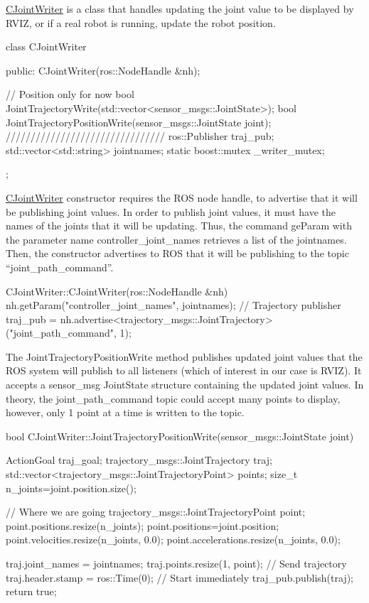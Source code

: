 \hyperlink{classCJointWriter}{C\-Joint\-Writer} is a class that handles updating the joint value to be displayed by R\-V\-I\-Z, or if a real robot is running, update the robot position. \begin{DoxyVerb}class CJointWriter {
public:
    CJointWriter(ros::NodeHandle &nh);

    // Position only for now
    bool JointTrajectoryWrite(std::vector<sensor_msgs::JointState>);
    bool JointTrajectoryPositionWrite(sensor_msgs::JointState joint);
    ////////////////////////////////
    ros::Publisher traj_pub;
    std::vector<std::string> jointnames;
    static boost::mutex _writer_mutex;
};  
\end{DoxyVerb}


\hyperlink{classCJointWriter}{C\-Joint\-Writer} constructor requires the R\-O\-S node handle, to advertise that it will be publishing joint values. In order to publish joint values, it must have the names of the joints that it will be updating. Thus, the command ge\-Param with the parameter name controller\-\_\-joint\-\_\-names retrieves a list of the jointnames. Then, the constructor advertises to R\-O\-S that it will be publishing to the topic “joint\-\_\-path\-\_\-command”. \begin{DoxyVerb}CJointWriter::CJointWriter(ros::NodeHandle &nh)
{
     nh.getParam("controller_joint_names", jointnames);
     // Trajectory publisher
    traj_pub = nh.advertise<trajectory_msgs::JointTrajectory>("joint_path_command", 1);
}
\end{DoxyVerb}


The Joint\-Trajectory\-Position\-Write method publishes updated joint values that the R\-O\-S system will publish to all listeners (which of interest in our case is R\-V\-I\-Z). It accepts a sensor\-\_\-msg Joint\-State structure containing the updated joint values. In theory, the joint\-\_\-path\-\_\-command topic could accept many points to display, however, only 1 point at a time is written to the topic. \begin{DoxyVerb}bool CJointWriter::JointTrajectoryPositionWrite(sensor_msgs::JointState joint) {

    ActionGoal traj_goal;
    trajectory_msgs::JointTrajectory traj;
    std::vector<trajectory_msgs::JointTrajectoryPoint> points;
    size_t n_joints=joint.position.size(); 

    // Where we are going
    trajectory_msgs::JointTrajectoryPoint point;
    point.positions.resize(n_joints);
    point.positions=joint.position;
    point.velocities.resize(n_joints, 0.0);
    point.accelerations.resize(n_joints, 0.0);

    traj.joint_names = jointnames;
    traj.points.resize(1, point);
    // Send trajectory
    traj.header.stamp = ros::Time(0); // Start immediately
    traj_pub.publish(traj);
    return true;
}
\end{DoxyVerb}


